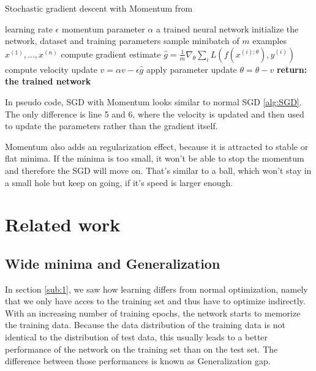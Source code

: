 \begin{algorithm}
    \begin{algorithmic}[1]
        \caption{Stochastic gradient descent with Momentum from \cite{Goodfellow-et-al-2016}}
        \REQUIRE learning rate $\epsilon$
        \REQUIRE momentum parameter $\alpha$
        \ENSURE a trained neural network
        \STATE initialize the network, dataset and training parameters
            \STATE sample minibatch of $m$ examples ${x^{(1)}, ... ,x^{(n)}}$
            \STATE compute gradient estimate $\hat{g}=\frac{1}{m} \nabla_\theta \sum_i L(f(x^{(i);\theta}),y^{(i)})$
            \STATE compute velocity update $v=\alpha v - \epsilon \hat{g}$
            \STATE apply parameter update $\theta=\theta-v$
        \ENDWHILE
        \STATE \textbf{return: the trained network}
    \end{algorithmic}
\end{algorithm}

In pseudo code, SGD with Momentum looks similar to normal SGD \ref{alg:SGD}. The
only difference is line 5 and 6, where the velocity is updated and then used to
update the parameters rather than the gradient itself.


Momentum also adds an regularization effect, because it is attracted to stable
or flat minima. If the minima is too small, it won't be able to stop the
momentum and therefore the SGD will move on. That's similar to a ball, which
won't stay in a small hole but keep on going, if it's speed is larger enough.






\section{Related work}
\subsection{Wide minima and Generalization}\label{sub:Generalization}
In section \ref{sub:1}, we saw how learning differs from normal optimization,
namely that we only have acces to the training set and thus have to optimize
indirectly. With an increasing number of training epochs, the network starts to
memorize the training data. Because the data distribution of the training data
is not identical to the distribution of test data, this usually leads to a
better performance of the network on the training set than on the test set. The
difference between those performances is known as Generalization gap. 

